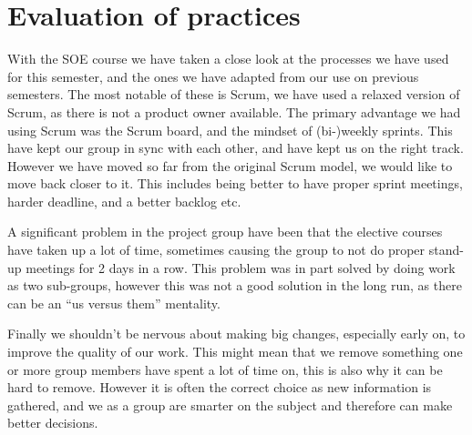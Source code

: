 \section{Evaluation of practices}
With the SOE course we have taken a close look at the processes we have used for this semester, and the ones we have adapted from our use on previous semesters.
The most notable of these is Scrum, we have used a relaxed version of Scrum, as there is not a product owner available. 
The primary advantage we had using Scrum was the Scrum board, and the mindset of (bi-)weekly sprints.
This have kept our group in sync with each other, and have kept us on the right track. 
However we have moved so far from the original Scrum model, we would like to move back closer to it.
This includes being better to have proper sprint meetings, harder deadline, and a better backlog etc. 

A significant problem in the project group have been that the elective courses have taken up a lot of time, sometimes causing the group to not do proper stand-up meetings for 2 days in a row. 
This problem was in part solved by doing work as two sub-groups, however this was not a good solution in the long run, as there can be an ``us versus them'' mentality. 

Finally we shouldn't be nervous about making big changes, especially early on, to improve the quality of our work. 
This might mean that we remove something one or more group members have spent a lot of time on, this is also why it can be hard to remove. 
However it is often the correct choice as new information is gathered, and we as a group are smarter on the subject and therefore can make better decisions.
